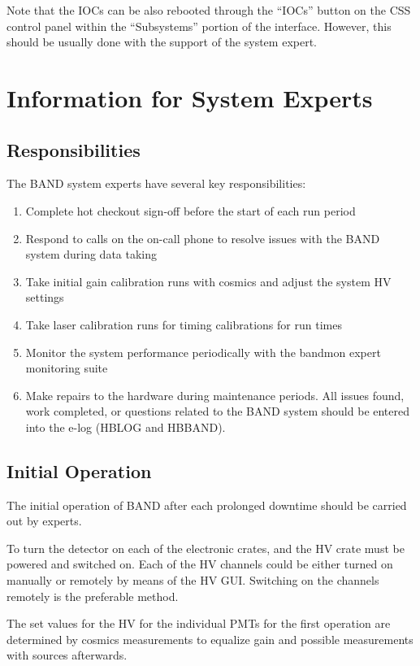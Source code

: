 \documentclass[12pt,letterpaper]{article}
\begin{document}
Note that the IOCs can be also rebooted through the “IOCs” button on the CSS control panel within the “Subsystems” portion of the interface. However, this should be usually done with the support of the system expert.

\section{Information for System Experts}
\label{sec:experts}
\subsection{Responsibilities}
The BAND system experts have several key responsibilities:
\begin{enumerate}
\item Complete hot checkout sign-off before the start of each run period %
\item Respond to calls on the on-call phone to resolve issues with the BAND system during data taking %
\item Take initial gain calibration runs with cosmics and adjust the system HV settings %
\item Take laser calibration runs for timing calibrations for run times
\item Monitor the system performance periodically with the bandmon expert monitoring suite %
\item Make repairs to the hardware during maintenance periods.
All issues found, work completed, or questions related to the BAND system should be entered into the e-log (HBLOG and HBBAND).
\end{enumerate}

\subsection{Initial Operation}
The initial operation of BAND after each prolonged downtime should be carried out by experts. 

To turn the detector on each of the electronic crates, and the HV crate must be powered and switched on. Each of the HV channels could be either turned on manually or remotely by means of the HV GUI. Switching on the channels remotely is the preferable method. 

The set values for the HV for the individual PMTs for the first operation are determined by cosmics measurements to equalize gain and possible measurements with sources afterwards.
\end{document}
